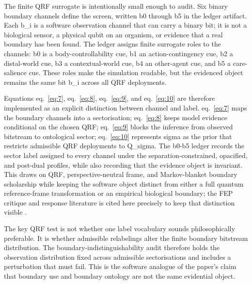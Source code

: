 \documentclass[
]{article}
\begin{document}
The finite QRF surrogate is intentionally small enough to audit. Six
binary boundary channels define the screen, written b0 through b5 in the
ledger artifact. Each b\_i is a software observation channel that can
carry a binary bit; it is not a biological sensor, a physical qubit on
an organism, or evidence that a real boundary has been found. The ledger
assigns finite surrogate roles to the channels: b0 is a
body-controllability cue, b1 an action-contingency cue, b2 a
distal-world cue, b3 a contextual-world cue, b4 an other-agent cue, and
b5 a care-salience cue. These roles make the simulation readable, but
the evidenced object remains the same bit b\_i across all QRF
deployments.

Equations eq.~\ref{eq:7}, eq.~\ref{eq:8}, eq.~\ref{eq:9}, and
eq.~\ref{eq:10} are therefore implemented as an explicit distinction
between channel and label. eq.~\ref{eq:7} maps the boundary channels
into a sectorisation; eq.~\ref{eq:8} keeps model evidence conditional on
the chosen QRF; eq.~\ref{eq:9} blocks the inference from observed
bitstream to ontological sector; eq.~\ref{eq:10} represents sigma as the
prior that restricts admissible QRF deployments to Q\_sigma. The b0-b5
ledger records the sector label assigned to every channel under the
separation-constrained, opacified, and post-dual profiles, while also
recording that the evidence object is invariant. This draws on QRF,
perspective-neutral frame, and Markov-blanket boundary scholarship while
keeping the software object distinct from either a full quantum
reference-frame transformation or an empirical biological boundary; the
FEP critique and response literature is cited here precisely to keep
that distinction visible
\citep{giacomini2019qrf, vanrietvelde2020perspective, kirchhoff2018blankets, hipolito2021markov, aguilera2021particular, biehl2021technical_fep, heins2022sparse_coupling}.

The key QRF test is not whether one label vocabulary sounds
philosophically preferable. It is whether admissible relabelings alter
the finite boundary bitstream distribution. The
boundary-indistinguishability audit therefore holds the observation
distribution fixed across admissible sectorisations and includes a
perturbation that must fail. This is the software analogue of the
paper's claim that boundary use and boundary ontology are not the same
evidential object.
\end{document}
